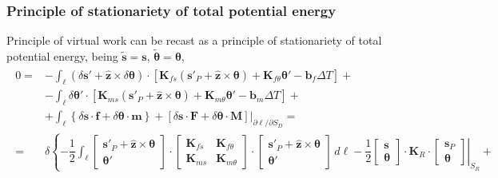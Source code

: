 \documentclass[letterpaper,10pt,english]{jupyterBook}
\begin{document}
\subsubsection{Principle of stationariety of total potential energy}
\label{\detokenize{ch/solids/small-displacements-statics-beams-weak-form-general:principle-of-stationariety-of-total-potential-energy}}\label{\detokenize{ch/solids/small-displacements-statics-beams-weak-form-general:solid-mechanics-intro-small-displacements-statics-beam-weak-form-weak-stationariety-potential}}
\sphinxAtStartPar
Principle of virtual work can be recast as a principle of stationariety of total potential energy, being \(\widetilde{\mathbf{s}} = \mathbf{s}\), \(\widetilde{\boldsymbol\theta} = \boldsymbol\theta\),
\begin{equation*}
\begin{split}\begin{aligned}
  0
  = & - \int_{\ell} ( \delta \mathbf{s}' + \hat{\mathbf{z}} \times \delta \boldsymbol{\theta} ) \cdot \left[ \mathbf{K}_{fs} \left( \mathbf{s}'_P + \hat{\mathbf{z}} \times \boldsymbol\theta \right) + \mathbf{K}_{f\theta} \boldsymbol\theta' - \mathbf{b}_f \Delta T \right] + \\
    & - \int_{\ell} \delta \boldsymbol{\theta}' \cdot \left[ \mathbf{K}_{ms} \left( \mathbf{s}'_P + \hat{\mathbf{z}} \times \boldsymbol{\theta} \right) + \mathbf{K}_{m\theta} \boldsymbol{\theta}' - \mathbf{b}_m \Delta T \right] + \\
    & + \int_{\ell} \left\{ \delta \mathbf{s} \cdot \mathbf{f} + \delta \boldsymbol{\theta} \cdot \mathbf{m} \right\} + \left. \left[ \delta \mathbf{s} \cdot \mathbf{F} + \delta \boldsymbol{\theta} \cdot \mathbf{M} \right] \right|_{\partial \ell / \partial S_D} = \\ 
  = & \delta \left\{ - \dfrac{1}{2} \int_{\ell} \begin{bmatrix} \mathbf{s}'_P + \hat{\mathbf{z}} \times \boldsymbol{\theta} \\ \boldsymbol{\theta}'  \end{bmatrix} \cdot \begin{bmatrix} \mathbf{K}_{fs} & \mathbf{K}_{f\theta} \\ \mathbf{K}_{ms} & \mathbf{K}_{m \theta} \end{bmatrix} \cdot \begin{bmatrix} \mathbf{s}'_P + \hat{\mathbf{z}} \times \boldsymbol{\theta} \\ \boldsymbol{\theta}' \end{bmatrix} \, d \ell - \dfrac{1}{2} \left.\begin{bmatrix} \mathbf{s} \\ \boldsymbol{\theta} \end{bmatrix} \cdot \mathbf{K}_{R} \cdot \begin{bmatrix} \mathbf{s}_P \\ \boldsymbol{\theta} \end{bmatrix}\right|_{S_R} \right. + \\

\end{aligned}
\end{split}
\end{equation*}
\end{document}
